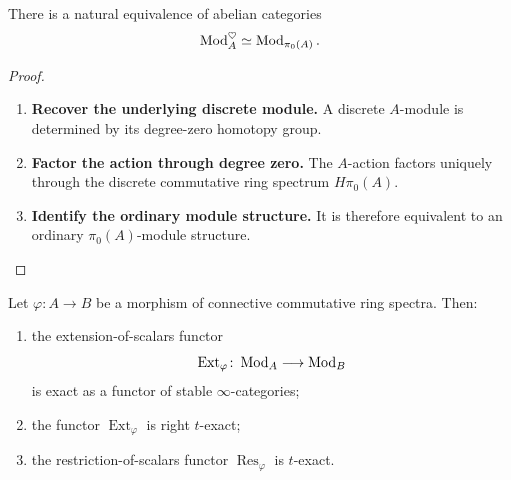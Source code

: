 \begin{proposition}
\label{prop:heart-module-category}
There is a natural equivalence of abelian categories
\[
    \operatorname{Mod}_A^\heartsuit
    \simeq
    \operatorname{Mod}_{\pi_0(A)}.
\]
\end{proposition}

\begin{proof}
\leavevmode
\begin{enumerate}[label=\textup{(\arabic*)}]
    \item \textbf{Recover the underlying discrete module.}
    A discrete $A$-module is determined by its degree-zero homotopy group.

    \item \textbf{Factor the action through degree zero.}
    The
    $A$-action factors uniquely through the discrete commutative ring spectrum
    $H\pi_0(A)$.

    \item \textbf{Identify the ordinary module structure.}
    It is therefore equivalent to an ordinary $\pi_0(A)$-module
    structure.
\end{enumerate}
\end{proof}

\begin{proposition}
\label{prop:base-change-exact-right-t-exact}
Let $\varphi:A\to B$ be a morphism of connective commutative ring spectra.
Then:
\begin{enumerate}[label=(\roman*)]
    \item the extension-of-scalars functor
    \[
        \operatorname{Ext}_{\varphi}
        \colon
        \operatorname{Mod}_A
        \longrightarrow
        \operatorname{Mod}_B
    \]
    is exact as a functor of stable $\infty$-categories;

    \item the functor $\operatorname{Ext}_{\varphi}$ is right $t$-exact;

    \item the restriction-of-scalars functor $\operatorname{Res}_{\varphi}$ is $t$-exact.
\end{enumerate}
\end{proposition}

